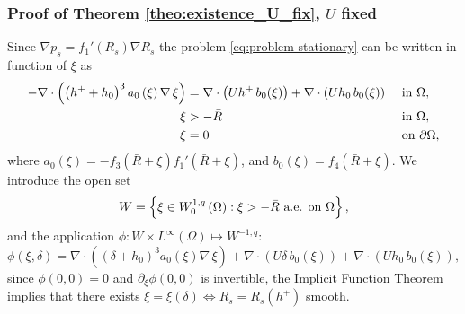 \documentclass[10pt,aspectratio=169]{beamer}
\newenvironment{nalign}{
	\begin{equation}
	\begin{aligned}
}{
	\end{aligned}
	\end{equation}
	\ignorespacesafterend
}
\begin{document}
\begin{frame}
\frametitle{Proof of Theorem \ref{theo:existence_U_fix}, $U$ fixed}
\vspace*{0.6cm}
Since $\nabla p_s=f_1'\left(R_s\right)\nabla R_s$ the problem \eqref{eq:problem-stationary} can be written in function of $\xi$ as
\begin{nalign}
	-\nabla\cdot \left(\left(h^++h_0\right)^3a_0\left(\xi\right)\nabla\,\xi\right)&=\nabla\cdot \left(U h^+\,b_0(\xi)\right)+\nabla\cdot \left(Uh_0\,b_0(\xi)\right)&&\textnormal{ in }\Omega,\\
	\xi&>-\bar{R}&&\textnormal{ in }\Omega,\\
	\xi&=0&&\textnormal{ on } \partial \Omega,
	\label{eq:problem-stationary-change}
\end{nalign}
where $a_0\left(\xi\right)=-f_3\left(\bar{R}+\xi\right)f_1'\left(\bar{R}+\xi\right)$, and $b_0(\xi)=f_4\left(\bar{R}+\xi\right)$. We introduce the open set
$$W=\left\{\xi\in W_0^{1,q}\left(\Omega\right):\xi >-\bar{R}\textnormal{ a.e. on } \Omega\right\},$$
and the application $\phi:W\times L^\infty\left(\Omega\right)\longmapsto W^{-1,q}$:
\begin{equation}
\phi(\xi,\delta) =  \nabla\cdot \left(\left(\delta+h_0\right)^3a_0\left(\xi\right)\nabla\,\xi\right)+\nabla\cdot \left(U\delta\,b_0(\xi)\right)+\nabla\cdot \left(Uh_0\,b_0(\xi)\right),
\end{equation}
since $\phi(0,0)=0$ and $\partial_\xi\phi(0,0)$ is invertible, the Implicit Function Theorem implies that there exists $\xi=\xi\left(\delta\right)\Leftrightarrow R_s=R_s\left(h^+\right)$ {\color{red}smooth}.
\end{frame}

\end{document}
